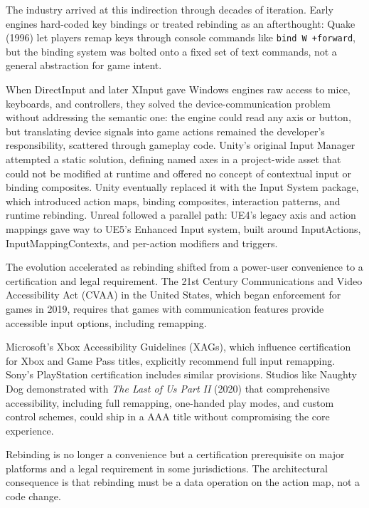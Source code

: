 \documentclass[
  11pt,
  letterpaper,
  DIV=11,
  numbers=noendperiod,
  twoside,
  open=right]{scrreprt}
\newcommand{\floattop}{%
  \floatplacement{codelisting}{!t}%
  \AfterEndEnvironment{codelisting}{\floatplacement{codelisting}{!htbp}}%
}
\begin{document}
The industry arrived at this indirection through decades of iteration.
Early engines hard-coded key bindings or treated rebinding as an
afterthought: Quake (1996) let players remap keys through console
commands like \texttt{bind\ W\ +forward}, but the binding system was
bolted onto a fixed set of text commands, not a general abstraction for
game intent.

When DirectInput and later XInput gave Windows engines raw access to
mice, keyboards, and controllers, they solved the device-communication
problem without addressing the semantic one: the engine could read any
axis or button, but translating device signals into game actions
remained the developer's responsibility, scattered through gameplay
code. Unity's original Input Manager attempted a static solution,
defining named axes in a project-wide asset that could not be modified
at runtime and offered no concept of contextual input or binding
composites. Unity eventually replaced it with the Input System package,
which introduced action maps, binding composites, interaction patterns,
and runtime rebinding. Unreal followed a parallel path: UE4's legacy
axis and action mappings gave way to UE5's Enhanced Input system, built
around InputActions, InputMappingContexts, and per-action modifiers and
triggers.

The evolution accelerated as rebinding shifted from a power-user
convenience to a certification and legal requirement. The 21st Century
Communications and Video Accessibility Act (CVAA) in the United States,
which began enforcement for games in 2019, requires that games with
communication features provide accessible input options, including
remapping.

Microsoft's Xbox Accessibility Guidelines (XAGs), which influence
certification for Xbox and Game Pass titles, explicitly recommend full
input remapping. Sony's PlayStation certification includes similar
provisions. Studios like Naughty Dog demonstrated with \emph{The Last of
Us Part II} (2020) that comprehensive accessibility, including full
remapping, one-handed play modes, and custom control schemes, could ship
in a AAA title without compromising the core experience.

Rebinding is no longer a convenience but a certification prerequisite on
major platforms and a legal requirement in some jurisdictions. The
architectural consequence is that rebinding must be a data operation on
the action map, not a code change.

\floattop
\end{document}
